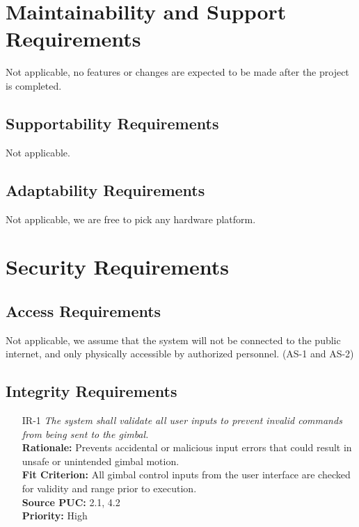 \documentclass[12pt]{article}
\begin{document}
\section{Maintainability and Support Requirements}

Not applicable, no features or changes are expected to be made after the
project is completed.

\subsection{Supportability Requirements}

Not applicable.

\subsection{Adaptability Requirements}

Not applicable, we are free to pick any hardware platform.

\section{Security Requirements}
\subsection{Access Requirements}

Not applicable, we assume that the system will not be connected to the public
internet, and only physically accessible by authorized personnel. (AS-1 and
AS-2)

\subsection{Integrity Requirements}
\begin{itemize}[leftmargin=*]
  \item[IR-1] \emph{The system shall validate all user inputs to prevent invalid
          commands from being sent to the gimbal.}\\[2mm]
        \textbf{Rationale:} Prevents accidental or malicious input errors that could result in unsafe or unintended gimbal motion.\\
        \textbf{Fit Criterion:} All gimbal control inputs from the user interface are checked for validity and range prior to execution.\\
        \textbf{Source PUC:} 2.1, 4.2 \\
        \textbf{Priority:} High
\end{itemize}
\end{document}
